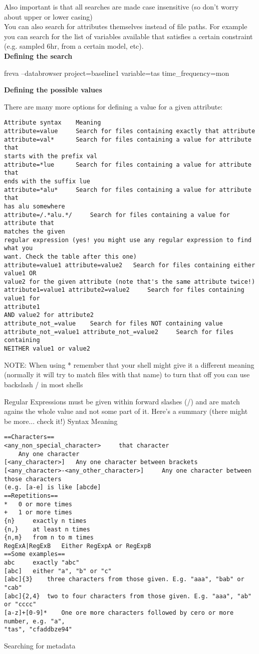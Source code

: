 \documentclass[a4paper,11pt]{ltxdoc}
\begin{document}
Also important is that all searches are made case insensitive (so don't worry about upper or lower casing)\\

You can also search for attributes themselves instead of file paths. For example you can search for the list of variables available that satisfies a certain constraint (e.g. sampled 6hr, from a certain model, etc). \\

\textbf{Defining the search}

freva --databrowser project=baseline1 variable=tas time\_frequency=mon

\textbf{Defining the possible values}

There are many more options for defining a value for a given attribute:
\begin{verbatim}
Attribute syntax 	Meaning
attribute=value 	Search for files containing exactly that attribute
attribute=val* 		Search for files containing a value for attribute that
starts with the prefix val
attribute=*lue 		Search for files containing a value for attribute that 
ends with the suffix lue
attribute=*alu* 	Search for files containing a value for attribute that 
has alu somewhere
attribute=/.*alu.*/ 	Search for files containing a value for attribute that 
matches the given 
regular expression (yes! you might use any regular expression to find what you 
want. Check the table after this one)
attribute=value1 attribute=value2 	Search for files containing either 
value1 OR 
value2 for the given attribute (note that's the same attribute twice!)
attribute1=value1 attribute2=value2 	Search for files containing value1 for 
attribute1 
AND value2 for attribute2
attribute_not_=value 	Search for files NOT containing value
attribute_not_=value1 attribute_not_=value2 	Search for files containing 
NEITHER value1 or value2
\end{verbatim}
NOTE: When using * remember that your shell might give it a different meaning (normally it will try to match files with that name) to turn that off you can use backslash / in most shells

Regular Expressions must be given within forward slashes (/) and are match agains the whole value and not some part of it. Here's a summary (there might be more... check it!)
Syntax 	Meaning
\begin{verbatim}
==Characters==
<any_non_special_character> 	that character
	Any one character
[<any_character>] 	Any one character between brackets
[<any_character>-<any_other_character>] 	Any one character between those characters 
(e.g. [a-e] is like [abcde]
==Repetitions==
* 	0 or more times
+ 	1 or more times
{n} 	exactly n times
{n,} 	at least n times
{n,m} 	from n to m times
RegExA|RegExB 	Either RegExpA or RegExpB
==Some examples==
abc 	exactly "abc"
[abc] 	either "a", "b" or "c"
[abc]{3} 	three characters from those given. E.g. "aaa", "bab" or "cab"
[abc]{2,4} 	two to four characters from those given. E.g. "aaa", "ab" or "cccc"
[a-z]+[0-9]* 	One ore more characters followed by cero or more number, e.g. "a", 
"tas", "cfaddbze94"
\end{verbatim}
Searching for metadata
\end{document}
